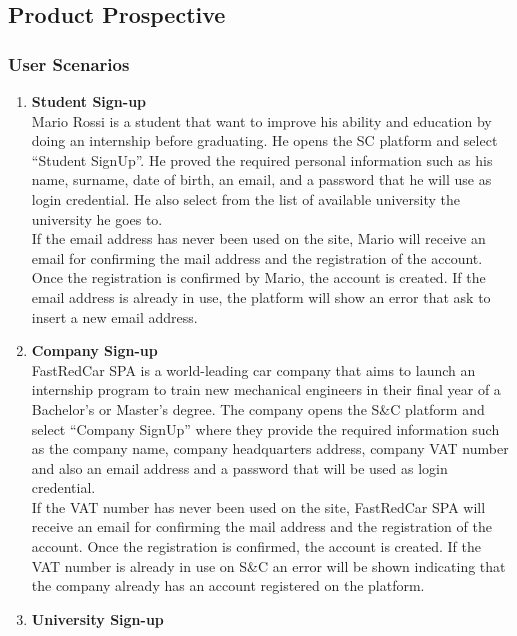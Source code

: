\subsection{Product Prospective}

\subsubsection{User Scenarios}

\begin{enumerate}
        \item \textbf{\textcolor{titleColor}{Student Sign-up}}\\
        Mario Rossi is a student that want to improve his ability and education by doing an internship before graduating. He opens the SC platform and select “Student SignUp”. He proved the required personal information such as his name, surname, date of birth, an email, and a password that he will use as login credential. He also select from the list of available university the university he goes to.\\
        If the email address has never been used on the site, Mario will receive an email for confirming the mail address and the registration of the account. Once the registration is confirmed by Mario, the account is created. If the email address is already in use, the platform will show an error that ask to insert a new email address.
    \item \textbf{\textcolor{titleColor}{Company Sign-up}}\\
        FastRedCar SPA is a world-leading car company that aims to launch an internship program to train new mechanical engineers in their final year of a Bachelor’s or Master’s degree. The company opens the S\&C platform and select “Company SignUp” where they provide the required information such as the company name, company headquarters address, company VAT number and also an email address and a password that will be used as login credential.\\
        If the VAT number has never been used on the site, FastRedCar SPA will receive an email for confirming the mail address and the registration of the account. Once the registration is confirmed, the account is created.
        If the VAT number is already in use on S\&C an error will be shown indicating that the company already has an account registered on the platform.
    \item \textbf{\textcolor{titleColor}{University Sign-up}}\\

\end{enumerate}
